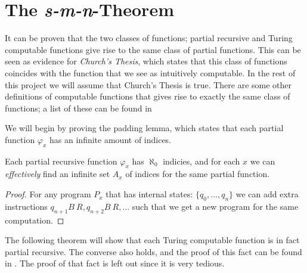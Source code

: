 \documentclass[../main.tex]{subfiles}
\begin{document}
\section{The \textit{s-m-n}-Theorem}

It can be proven that the two classes of functions; partial recursive and Turing
computable functions give rise to the same class of partial functions. This
can be seen as evidence for \textit{Church's Thesis}, which states that this
class of functions coincides with the function that we see as intuitively
computable. In the rest of this project we will assume that Church's Thesis
is true. There are some other definitions of computable functions that gives
rise to exactly the same class of functions; a list of these can be found in
\parencite{Cutland1980}

We will begin by proving the padding lemma, which states that each partial
function $\varphi_x$ has an infinite amount of indices.
\begin{lem}
	Each partial recursive function $\varphi_x$ has $\aleph_0$ indicies,
	and for each $x$ we can \textit{effectively} find an infinite set $A_x$
	of indices for the same partial function.
\end{lem}
\begin{proof}
	For any program $P_x$ that has internal states: $\{q_0,\ldots, q_n\}$
	we can add extra instructions $q_{n+1}B\ R ,q_{n+2}B\ R,\ldots$ such
	that we get a new program for the same computation.
\end{proof}

The following theorem will show that each Turing computable function is in fact
partial recursive. The converse also holds, and the proof of this fact can be
found in \parencite{Kleene1952}. The proof of that fact is left out since it is
very tedious.
\end{document}
